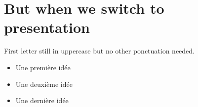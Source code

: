 \documentclass{article}
\begin{document}
\section{But when we switch to presentation}

\begin{frame}
First letter still in uppercase but no other ponctuation needed.

\begin{itemize}
\item Une première idée
\item Une deuxième idée
\item Une dernière idée
\end{itemize}
\end{frame}
\end{document}
